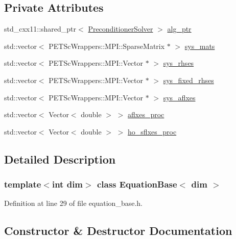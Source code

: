 \subsection*{Private Attributes}
\begin{DoxyCompactItemize}
\item 
std\+\_\+cxx11\+::shared\+\_\+ptr$<$ \hyperlink{class_preconditioner_solver}{Preconditioner\+Solver} $>$ \hyperlink{class_equation_base_aa4b83dfa34d4588cf3250a21ffc2e984}{alg\+\_\+ptr}
\item 
std\+::vector$<$ P\+E\+T\+Sc\+Wrappers\+::\+M\+P\+I\+::\+Sparse\+Matrix $\ast$ $>$ \hyperlink{class_equation_base_afcdb76718da046b950c466500de44a03}{sys\+\_\+mats}
\item 
std\+::vector$<$ P\+E\+T\+Sc\+Wrappers\+::\+M\+P\+I\+::\+Vector $\ast$ $>$ \hyperlink{class_equation_base_a89fe13a13fa7f46cc20bdab8a884216c}{sys\+\_\+rhses}
\item 
std\+::vector$<$ P\+E\+T\+Sc\+Wrappers\+::\+M\+P\+I\+::\+Vector $\ast$ $>$ \hyperlink{class_equation_base_a556e9d3b402dae0303e786e2ef38a29b}{sys\+\_\+fixed\+\_\+rhses}
\item 
std\+::vector$<$ P\+E\+T\+Sc\+Wrappers\+::\+M\+P\+I\+::\+Vector $\ast$ $>$ \hyperlink{class_equation_base_afe48e9f1d2f6b4f13cefe80d43d18300}{sys\+\_\+aflxes}
\item 
std\+::vector$<$ Vector$<$ double $>$ $>$ \hyperlink{class_equation_base_aa5a26770211dc6c8b2c17e35deffa60b}{aflxes\+\_\+proc}
\item 
std\+::vector$<$ Vector$<$ double $>$ $>$ \hyperlink{class_equation_base_a25123cf5f335e267799a52420396a276}{ho\+\_\+sflxes\+\_\+proc}
\end{DoxyCompactItemize}


\subsection{Detailed Description}
\subsubsection*{template$<$int dim$>$\newline
class Equation\+Base$<$ dim $>$}



Definition at line 29 of file equation\+\_\+base.\+h.



\subsection{Constructor \& Destructor Documentation}
\mbox{\label{class_equation_base_a1e027696da2ab5a030daa34bf99430fe}} 
